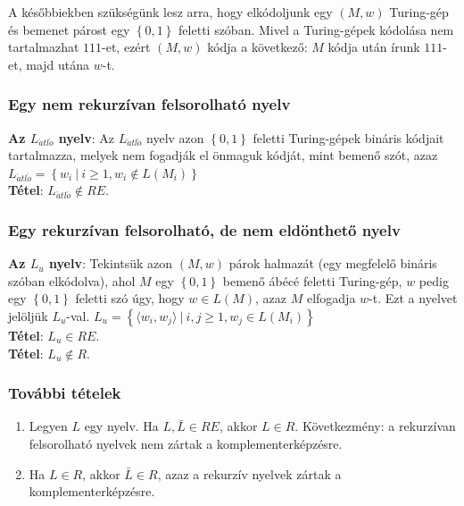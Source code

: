\documentclass[margin=0px]{article}
\begin{document}
A későbbiekben szükségünk lesz arra, hogy elkódoljunk egy $(M, w)$ Turing-gép és bemenet
párost egy $\left\{0, 1\right\}$ feletti szóban. Mivel a Turing-gépek kódolása nem tartalmazhat
$111$-et, ezért $(M, w)$ kódja a következő: $M$ kódja után írunk $111$-et, majd utána $w$-t.

\subsubsection{Egy nem rekurzívan felsorolható nyelv}

\noindent \textbf{Az $L_{\acute{a}tl\acute{o}}$ nyelv}: Az $L_{\acute{a}tl\acute{o}}$ nyelv azon $\left\{0, 1\right\}$
feletti Turing-gépek bináris kódjait tartalmazza, melyek nem fogadják el önmaguk kódját, mint bemenő szót, azaz
$L_{\acute{a}tl\acute{o}} = \left\{w_{i} \ | \ i \geq 1, w_{i} \notin L(M_{i}) \right\}$\\

\noindent \textbf{Tétel}: $L_{\acute{a}tl\acute{o}} \notin RE$.

\subsubsection{Egy rekurzívan felsorolható, de nem eldönthető nyelv}

\noindent \textbf{Az $L_{u}$ nyelv}: Tekintsük azon $(M, w)$ párok halmazát (egy megfelelő bináris szóban elkódolva),
ahol $M$ egy $\left\{0, 1\right\}$	bemenő ábécé feletti Turing-gép, $w$ pedig egy $\left\{0, 1\right\}$ feletti
szó úgy, hogy $w \in L(M)$, azaz $M$ elfogadja $w$-t. Ezt a nyelvet jelöljük $L_{u}$-val.
$L_{u} = \left\{\langle w_{i},w_{j} \rangle \ | \ i, j \geq 1, w_{j} \in L(M_{i}) \right\}$\\

\noindent \textbf{Tétel}: $L_{u} \in RE$.\\

\noindent \textbf{Tétel}: $L_{u} \notin R$.

\subsubsection{További tételek}

\begin{enumerate}
    \item	Legyen $L$ egy nyelv. Ha $L, \bar{L} \in RE$, akkor $L \in R$. Következmény: a rekurzívan felsorolható
          nyelvek nem zártak a komplementerképzésre.

    \item	Ha $L \in R$, akkor $\bar{L} \in R$, azaz a rekurzív nyelvek zártak a komplementerképzésre.
\end{enumerate}
\end{document}
